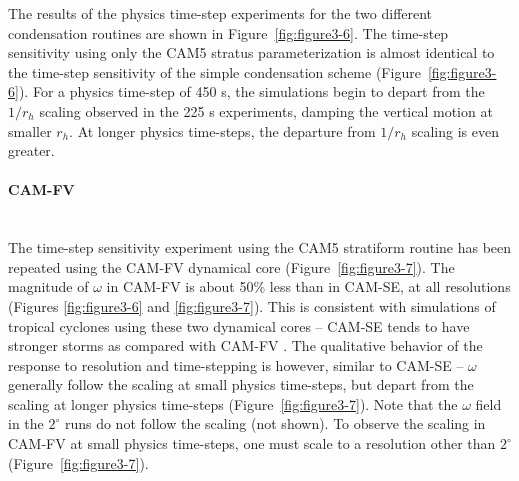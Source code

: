 The results of the physics time-step experiments for the two different condensation routines are shown in Figure~\ref{fig:figure3-6}. The time-step sensitivity using only the CAM5 stratus parameterization is almost identical to the time-step sensitivity of the simple condensation scheme (Figure~\ref{fig:figure3-6}). For a physics time-step of 450 s, the simulations begin to depart from the $1/r_h$ scaling observed in the 225 s experiments, damping the vertical motion at smaller $r_h$. At longer physics time-steps, the departure from $1/r_h$ scaling is even greater.

\paragraph{CAM-FV} ~\\
The time-step sensitivity experiment using the CAM5 stratiform routine has been repeated using the CAM-FV dynamical core (Figure~\ref{fig:figure3-7}). The magnitude of $\omega$ in CAM-FV is about 50\% less than in CAM-SE, at all resolutions (Figures \ref{fig:figure3-6} and \ref{fig:figure3-7}). This is consistent with simulations of tropical cyclones using these two dynamical cores – CAM-SE tends to have stronger storms as compared with CAM-FV \citep{RJ2012JAMES,RETAL2012ASL,RETAL2015JAS}. The qualitative behavior of the response to resolution and time-stepping is however, similar to CAM-SE – $\omega$ generally follow the scaling at small physics time-steps, but depart from the scaling at longer physics time-steps (Figure~\ref{fig:figure3-7}). Note that the $\omega$ field in the $2^{\circ}$ runs do not follow the scaling (not shown). To observe the scaling in CAM-FV at small physics time-steps, one must scale to a resolution other than $2^{\circ}$ (Figure~\ref{fig:figure3-7}).

